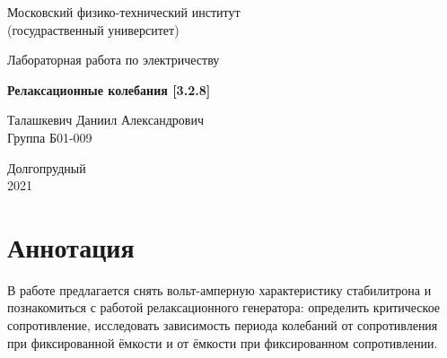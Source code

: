 \documentclass[a4paper, 12pt]{article}%
\begin{document}


\begin{titlepage}

	\newpage
	\begin{center}
		\normalsize Московский физико-технический институт \\(госудраственный 			университет)
	\end{center}

	\vspace{6em}

	\begin{center}
		\Large Лабораторная работа по электричеству\\
	\end{center}

	\vspace{1em}

	\begin{center}
		\large \textbf{Релаксационные колебания [3.2.8]}
	\end{center}

	\vspace{2em}

	\begin{center}
		\large Талашкевич Даниил Александрович\\
		Группа Б01-009
	\end{center}

	\vspace{\fill}

	\begin{center}
	Долгопрудный \\2021
	\end{center}
	
\end{titlepage}



	\thispagestyle{empty}
	\newpage
	\tableofcontents
	\newpage
	\setcounter{page}{1}



\section{Аннотация}

В работе предлагается снять вольт-амперную характеристику стабилитрона и познакомиться с работой релаксационного генератора: определить критическое сопротивление, исследовать зависимость периода колебаний от сопротивления при фиксированной ёмкости и от ёмкости при фиксированном сопротивлении.
\end{document}

